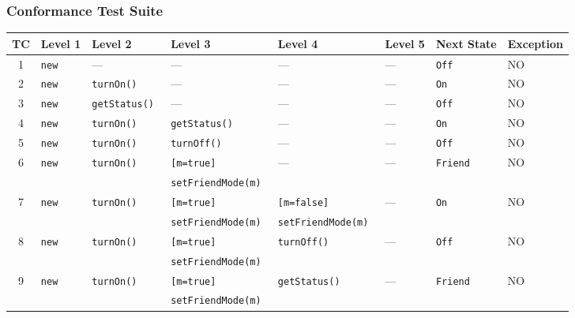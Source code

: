 \subsubsection{Conformance Test Suite}
\label{sec:classes.mobile.conformance}
\begin{table}[ht]
  \scriptsize
  \centering
  \begin{tabular}{|c|*{7}{l|}}
    \hline
    \textbf{TC} & \textbf{Level 1} & \textbf{Level 2} & \textbf{Level 3}
      & \textbf{Level 4} & \textbf{Level 5} & \textbf{Next State}
      & \textbf{Exception} \\ \hline
     1 & \tt new & --- & --- & --- & --- & \tt Off & NO \\ \hline
     
     2 & \tt new & \tt turnOn() & --- & --- & --- & \tt On & NO \\ \hline
     3 & \tt new & \tt getStatus() & --- & --- & --- & \tt Off & NO \\ \hline
     
     4 & \tt new & \tt turnOn() & \tt getStatus() & --- & --- & \tt On & NO \\ \hline
     5 & \tt new & \tt turnOn() & \tt turnOff() & --- & --- & \tt Off & NO \\ \hline
     6 & \tt new & \tt turnOn() & \tt [m=true] & --- & --- & \tt Friend & NO \\
       &         &              & \tt setFriendMode(m) &&&& \\ \hline
     
     7 & \tt new & \tt turnOn() & \tt [m=true]         & \tt [m=false] & --- & \tt On & NO \\
       &         &              & \tt setFriendMode(m) & \tt setFriendMode(m) &&& \\ \hline
     8 & \tt new & \tt turnOn() & \tt [m=true] & \tt turnOff() & --- & \tt Off & NO \\
       &         &              & \tt setFriendMode(m) &&&& \\ \hline
     9 & \tt new & \tt turnOn() & \tt [m=true] & \tt getStatus() & --- & \tt Friend & NO \\
       &         &              & \tt setFriendMode(m) &&&& \\ \hline
    

\end{tabular}
\end{table}
